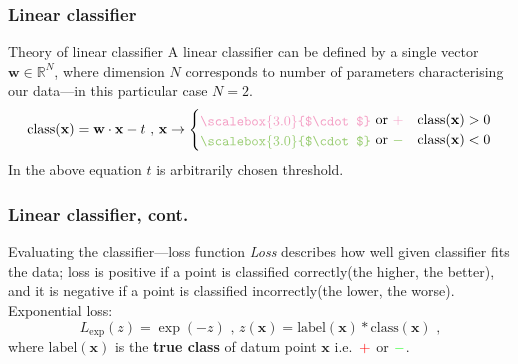 \documentclass{beamer}
\newcommand*{\LargerCdot}{\raisebox{-0.25ex}{\scalebox{3.0}{$\cdot$}}}
\begin{document}
  \begin{frame}
    \frametitle{Linear classifier}
    \begin{block}{Theory of linear classifier}
      A linear classifier can be defined by a single vector $\mathbf{w} \in \mathbb{R}^N$, where dimension $N$ corresponds to number of parameters characterising our data---in this particular case $N=2$.
      $$
        \text{class}(\mathbf{x}) = \mathbf{w} \cdot \mathbf{x} - t \text{  ,  } \mathbf{x} \rightarrow \begin{cases} \textcolor{redish}{\LargerCdot} \text{ or } \textcolor{redish}{+} & \text{class}(\mathbf{x}) > 0 \\ \textcolor{greenish}{\LargerCdot} \text{ or } \textcolor{greenish}{-} & \text{class}(\mathbf{x}) < 0  \end{cases}
      $$
      In the above equation $t$ is arbitrarily chosen threshold.
    \end{block}
  \end{frame}

  \begin{frame}
    \frametitle{Linear classifier, cont.}
    \begin{block}{Evaluating the classifier---loss function}
      \textit{Loss} describes how well given classifier fits the data; loss is positive if a point is classified correctly(the higher, the better), and it is negative if a point is classified incorrectly(the lower, the worse).\\
      Exponential loss:
      $$
        L_{\text{exp}}(z) = \exp(-z) \text{  ,  } z(\mathbf{x}) = \text{label}(\mathbf{x}) * \text{class}(\mathbf{x}) \text{ ,}
      $$
      where $\text{label}(\mathbf{x})$ is the \textbf{true class} of datum point $\mathbf{x}$ i.e.\ $\textcolor{red}{+}$ or $\textcolor{green}{-}$.
    \end{block}
  \end{frame}
\end{document}
